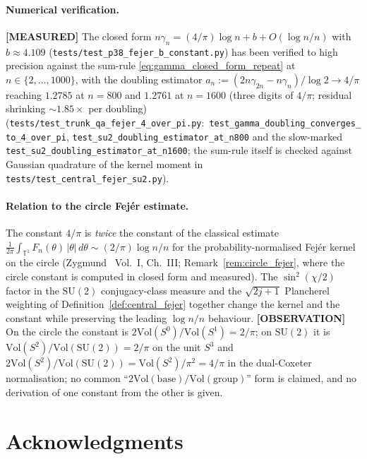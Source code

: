 \documentclass[11pt,a4paper]{article}
\theoremstyle{plain}
\theoremstyle{definition}
\newcommand{\sthree}{S^{3}}
\newcommand{\T}{\mathbb{T}}
\newcommand{\SU}{\mathrm{SU}}
\newcommand{\Vol}{\mathrm{Vol}}
\begin{document}
\paragraph{Numerical verification.}
\textbf{[MEASURED]} The closed form
$n \gamma_n = (4/\pi) \log n + b + O(\log n/n)$ with
$b \approx 4.109$ (\texttt{tests/test\_p38\_fejer\_b\_constant.py}) has been verified to high precision against the
sum-rule \eqref{eq:gamma_closed_form_repeat} at $n \in \{2, \ldots,
1000\}$, with the doubling estimator $a_n := (2n \gamma_{2n} - n
\gamma_n)/\log 2 \to 4/\pi$ reaching $1.2785$ at $n = 800$ and
$1.2761$ at $n = 1600$ (three digits of $4/\pi$; residual shrinking
${\sim}1.85\times$ per doubling)
(\texttt{tests/test\_trunk\_qa\_fejer\_4\_over\_pi.py}:\
\texttt{test\_gamma\_doubling\_converges\_to\_4\_over\_pi},
\texttt{test\_su2\_doubling\_estimator\_at\_n800} and the slow-marked
\texttt{test\_su2\_doubling\_estimator\_at\_n1600}; the
sum-rule itself is checked against Gaussian quadrature of the kernel
moment in \texttt{tests/test\_central\_fejer\_su2.py}).

\paragraph{Relation to the circle Fej\'er estimate.}
The constant $4/\pi$ is \emph{twice} the constant of the classical
estimate
$\frac{1}{2\pi}\int_{\T^1} F_n(\theta)\,|\theta|\,d\theta \sim (2/\pi)
\log n / n$ for the probability-normalised Fej\'er kernel on the
circle (Zygmund~\cite{zygmund2002} Vol.~I, Ch.~III;
Remark~\ref{rem:circle_fejer}, where the circle constant is computed
in closed form and measured). The $\sin^2(\chi/2)$ factor in the
$\SU(2)$ conjugacy-class measure and the $\sqrt{2j+1}$ Plancherel
weighting of Definition~\ref{def:central_fejer} together change the
kernel and the constant while preserving the leading $\log n / n$
behaviour. \textbf{[OBSERVATION]} On the circle the constant is $2\Vol(S^0)/\Vol(S^1)
= 2/\pi$; on $\SU(2)$ it is $\Vol(S^2)/\Vol(\SU(2)) = 2/\pi$ on the unit
$\sthree$ and $2\Vol(S^2)/\Vol(\SU(2)) = \Vol(S^2)/\pi^2 = 4/\pi$ in the
dual-Coxeter normalisation; no common ``$2\Vol(\text{base})/\Vol(\text{group})$''
form is claimed, and no derivation of one constant from
the other is given.

\section*{Acknowledgments}
\end{document}
